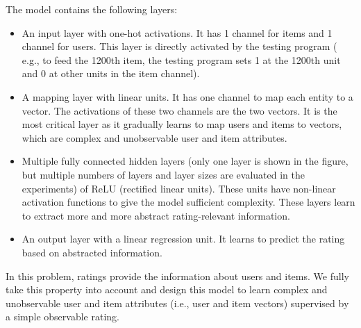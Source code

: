 \documentclass[letterpaper]{article}
\begin{document}
The model contains the following layers:
\begin{itemize}
	\item An input layer with one-hot activations.
	It has 1 channel for items and 1 channel for users.
	This layer is directly activated by the testing program (
	e.g., to feed the 1200th item, the testing program sets 1 at the 1200th 
	unit and 0 at other units in the item channel).
	\item A mapping layer with linear units. It has one channel to map each 
	entity to a vector.
	The activations of these two channels are the two vectors.
	It is the most critical layer as it gradually learns to map users and 
	items to vectors,
	which are complex and unobservable user and item attributes.
	\item Multiple fully connected hidden layers (only one layer is shown in the
	figure, but	multiple numbers of layers and layer sizes are evaluated in 
	the experiments) of ReLU (rectified linear units).
	These units have non-linear activation functions to give the model 
	sufficient complexity.
	These layers learn to extract more and more abstract rating-relevant 
	information.
	\item An output layer with a linear regression unit.
	It learns to predict the rating based on abstracted information.
\end{itemize}
In this problem, ratings provide the information about users and items.
We fully take this property into account and design this model to learn 
complex and unobservable user and item attributes (i.e., user and item vectors) 
supervised by a simple observable rating.
\end{document}
